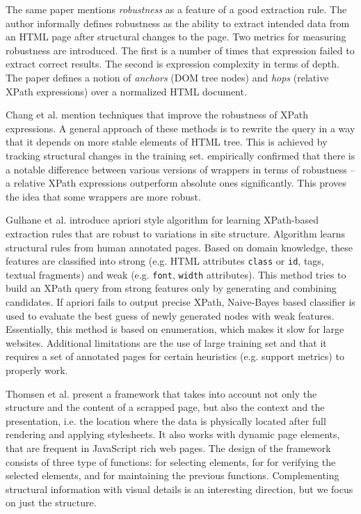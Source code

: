 The same paper mentions \emph{robustness} as a feature of a good extraction rule. The author informally defines robustness as the ability to extract intended data from an HTML page after structural changes to the page. Two metrics for measuring robustness are introduced. The first is a number of times that expression failed to extract correct results. The second is expression complexity in terms of depth. The paper defines a notion of \emph{anchors} (DOM tree nodes) and \emph{hops} (relative XPath expressions) over a normalized HTML document. 

Chang et al. \cite{Chang:2006:SWI:1159162.1159300} mention techniques that improve the robustness of XPath expressions. A general approach of these methods is to rewrite the query in a way that it depends on more stable elements of HTML tree. This is achieved by tracking structural changes in the training set. \cite{Kowalkiewicz:2006:RWC:1135777.1135928} empirically confirmed that there is a notable difference between various versions of wrappers in terms of robustness -- a relative XPath expressions outperform absolute ones significantly. This proves the idea that some wrappers are more robust.

Gulhane et al. \cite{DBLP:conf/icde/GulhaneMMRRSSTT11} introduce apriori style algorithm for learning XPath-based extraction rules that are robust to variations in site structure. Algorithm learns structural rules from human annotated pages. Based on domain knowledge, these features are classified into strong (e.g. HTML attributes \texttt{class} or \texttt{id}, tags, textual fragments) and weak (e.g. \texttt{font}, \texttt{width} attributes). This method tries to build an XPath query from strong features only by generating and combining candidates. If apriori fails to output precise XPath, Naive-Bayes based classifier is used to evaluate the best guess of newly generated nodes with weak features. Essentially, this method is based on enumeration, which makes it slow for large websites. Additional limitations are the use of large training set and that it requires a set of annotated pages for certain heuristics (e.g. support metrics) to properly work. 

Thomsen et al. \cite{Thomsen:2012:WWS:2364120.2364156} present a framework that takes into account not only the structure and the content of a scrapped page, but also the context and the presentation, i.e. the location where the data is physically located after full rendering and applying stylesheets. It also works with dynamic page elements, that are frequent in JavaScript rich web pages. The design of the framework consists of three type of functions: for selecting elements, for for verifying the selected elements, and for maintaining the previous functions. Complementing structural information with visual details is an interesting direction, but we focus on just the structure.


